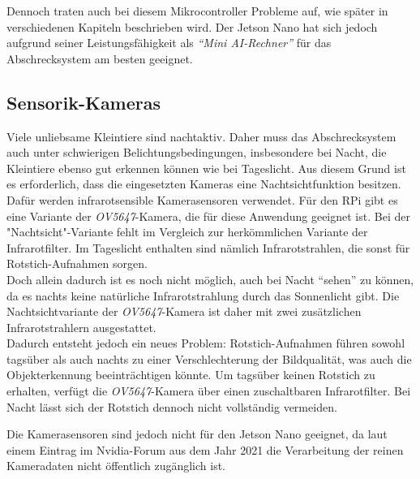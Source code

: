 Dennoch traten auch bei diesem Mikrocontroller Probleme auf, wie später in verschiedenen Kapiteln beschrieben wird. Der Jetson Nano hat sich jedoch aufgrund seiner Leistungsfähigkeit als \textit{"`Mini AI-Rechner"'} für das Abschrecksystem am besten geeignet.

\subsection{Sensorik-Kameras}

Viele unliebsame Kleintiere sind nachtaktiv. Daher muss das Abschrecksystem auch unter schwierigen Belichtungsbedingungen, insbesondere bei Nacht, die Kleintiere ebenso gut erkennen können wie bei Tageslicht. Aus diesem Grund ist es erforderlich, dass die eingesetzten Kameras eine Nachtsichtfunktion besitzen. Dafür werden infrarotsensible Kamerasensoren verwendet. Für den \acl{RPi} gibt es eine Variante der \textit{OV5647}-Kamera, die für diese Anwendung geeignet ist. Bei der "Nachtsicht"-Variante fehlt im Vergleich zur herkömmlichen Variante der Infrarotfilter. Im Tageslicht enthalten sind nämlich Infrarotstrahlen, die sonst für Rotstich-Aufnahmen sorgen. 
\\
Doch allein dadurch ist es noch nicht möglich, auch bei Nacht "`sehen"' zu können, da es nachts keine natürliche Infrarotstrahlung durch das Sonnenlicht gibt. Die Nachtsichtvariante der \textit{OV5647}-Kamera ist daher mit zwei zusätzlichen Infrarotstrahlern ausgestattet.
\\
Dadurch entsteht jedoch ein neues Problem: Rotstich-Aufnahmen führen sowohl tagsüber als auch nachts zu einer Verschlechterung der Bildqualität, was auch die Objekterkennung beeinträchtigen könnte. Um tagsüber keinen Rotstich zu erhalten, verfügt die \textit{OV5647}-Kamera über einen zuschaltbaren Infrarotfilter. Bei Nacht lässt sich der Rotstich dennoch nicht vollständig vermeiden. \cite{ov_5647}

Die Kamerasensoren sind jedoch nicht für den Jetson Nano geeignet, da laut einem Eintrag im Nvidia-Forum aus dem Jahr 2021 die Verarbeitung der reinen Kameradaten nicht öffentlich zugänglich ist. \cite{nvidia_forum_2021_nvidia}
\\


